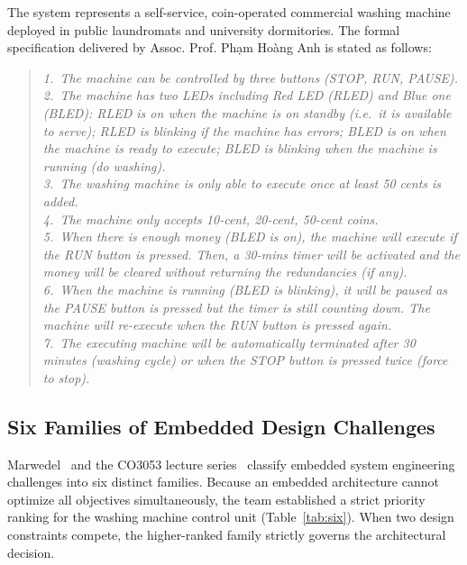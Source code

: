 The system represents a self-service, coin-operated commercial washing machine deployed in public laundromats
and university dormitories. The formal specification delivered by Assoc. Prof. Ph{\d{a}}m Ho{\`a}ng Anh is stated
as follows:

\begin{quote}\small\itshape
1.~The machine can be controlled by three buttons (STOP, RUN, PAUSE).\\
2.~The machine has two LEDs including Red LED (RLED) and Blue one (BLED):
RLED is on when the machine is on standby (i.e.\ it is available to serve);
RLED is blinking if the machine has errors; BLED is on when the machine is ready to execute;
BLED is blinking when the machine is running (do washing).\\
3.~The washing machine is only able to execute once at least 50 cents is added.\\
4.~The machine only accepts 10-cent, 20-cent, 50-cent coins.\\
5.~When there is enough money (BLED is on), the machine will execute if the RUN button is pressed.
Then, a 30-mins timer will be activated and the money will be cleared without returning the
redundancies (if any).\\
6.~When the machine is running (BLED is blinking), it will be paused as the PAUSE button is pressed
but the timer is still counting down. The machine will re-execute when the RUN button is pressed again.\\
7.~The executing machine will be automatically terminated after 30 minutes (washing cycle) or when
the STOP button is pressed twice (force to stop).
\end{quote}

\subsection{Six Families of Embedded Design Challenges}
\label{sec:six}

Marwedel~\cite{marwedel} and the CO3053 lecture series~\cite{lec} classify embedded system engineering
challenges into six distinct families. Because an embedded architecture cannot optimize all objectives
simultaneously, the team established a strict priority ranking for the washing machine control unit
(Table~\ref{tab:six}). When two design constraints compete, the higher-ranked family strictly governs the
architectural decision.

